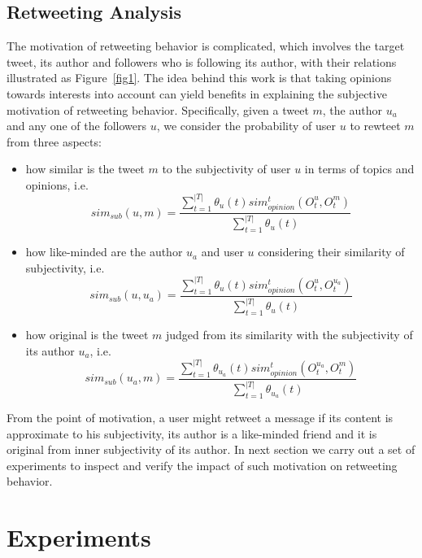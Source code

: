 \documentclass{acm_proc_article-sp}
\begin{document}
\subsection{Retweeting Analysis}
\label{analysis}

The motivation of retweeting behavior is complicated, which involves the target tweet, its author and followers who is following its author, with their relations illustrated as Figure~\ref{fig1}. 
The idea behind this work is that taking opinions towards interests into account can yield benefits in explaining the subjective motivation of retweeting behavior. 
Specifically, given a tweet $ m $, the author $ u_{a} $ and any one of the followers $ u $, we consider the probability of user $ u $ to rewteet $ m $ from three aspects: 
\begin{itemize}
\item how similar is the tweet $ m $ to the subjectivity of user $ u $ in terms of topics and opinions, i.e. 
\begin{equation}
 sim_{sub} \left( u,m \right) =\dfrac{\sum_{t=1}^{|T|}\theta_{u}(t) sim_{opinion}^{t}(O_{t}^{u},O_{t}^{m})}{\sum_{t=1}^{|T|}\theta_{u}(t)}
\end{equation}
\item how like-minded are the author $ u_{a} $ and user $ u $ considering their similarity of subjectivity, i.e.
\begin{equation}
 sim_{sub} \left( u,u_{a} \right) =\dfrac{\sum_{t=1}^{|T|}\theta_{u}(t) sim_{opinion}^{t}(O_{t}^{u},O_{t}^{u_{a}})}{\sum_{t=1}^{|T|}\theta_{u}(t)}
\end{equation}
\item how original is the tweet $ m $ judged from its similarity with the subjectivity of its author $ u_{a} $, i.e.  
\begin{equation}
 sim_{sub} \left( u_{a},m \right) =\dfrac{\sum_{t=1}^{|T|}\theta_{u_{a}}(t) sim_{opinion}^{t}(O_{t}^{u_{a}},O_{t}^{m})}{\sum_{t=1}^{|T|}\theta_{u_{a}}(t)}
\end{equation}
\end{itemize}
From the point of motivation, a user might retweet a message if its content is approximate to his subjectivity, its author is a like-minded friend and it is original from inner subjectivity of its author. 
In next section we carry out a set of experiments to inspect and verify the impact of such motivation on retweeting behavior. 

\section{Experiments}
\label{experiments}
\end{document}
